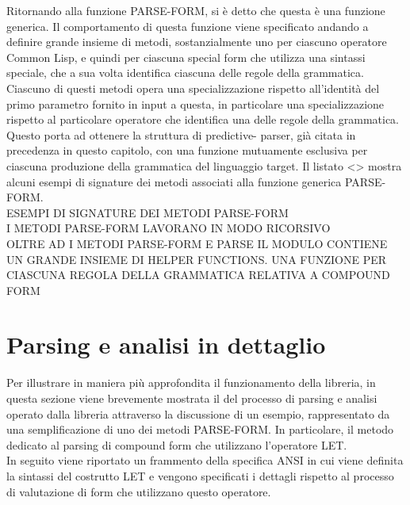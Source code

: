 Ritornando alla funzione PARSE-FORM, si è detto che questa è una funzione
generica. Il comportamento di questa funzione viene specificato andando a
definire grande insieme di metodi, sostanzialmente uno per ciascuno operatore
Common Lisp, e quindi per ciascuna special form che utilizza una sintassi
speciale, che a sua volta identifica ciascuna delle regole della grammatica.
Ciascuno di questi metodi opera una specializzazione rispetto all’identità del
primo parametro fornito in input a questa,  in particolare una
specializzazione rispetto al particolare operatore che identifica una delle
regole della grammatica. Questo porta ad ottenere la struttura di predictive-
parser, già citata in precedenza in questo capitolo, con una funzione
mutuamente esclusiva per ciascuna produzione della grammatica del linguaggio
target. Il listato <> mostra alcuni esempi di signature dei metodi associati
alla funzione generica PARSE-FORM.\\

ESEMPI DI SIGNATURE DEI METODI PARSE-FORM\\

I METODI PARSE-FORM LAVORANO IN MODO RICORSIVO\\

OLTRE AD I METODI PARSE-FORM E PARSE IL MODULO CONTIENE UN GRANDE INSIEME DI
HELPER FUNCTIONS. UNA FUNZIONE PER CIASCUNA REGOLA DELLA GRAMMATICA RELATIVA A
COMPOUND FORM

\section{Parsing e analisi in dettaglio}

Per illustrare in maniera più approfondita il funzionamento della libreria, in
questa sezione viene brevemente mostrata il del processo di parsing e analisi
operato dalla libreria attraverso la discussione di un esempio, rappresentato
da una semplificazione di uno dei metodi PARSE-FORM. In particolare, il metodo
dedicato al parsing di compound form che utilizzano l’operatore LET.\\

In seguito viene riportato un frammento della specifica ANSI in cui viene
definita la sintassi del costrutto LET e vengono specificati i dettagli
rispetto al processo di valutazione di form che utilizzano questo operatore.\\

